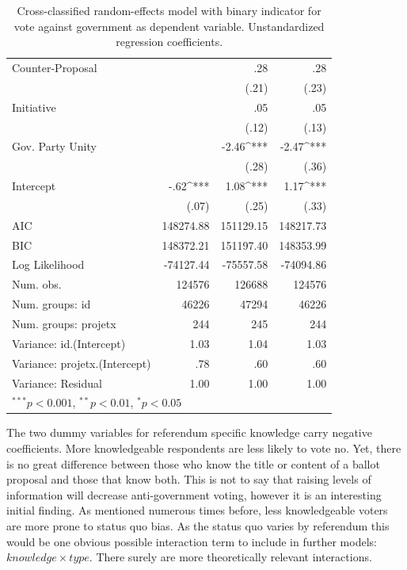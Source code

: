 \documentclass[11pt,a4paper]{article}\usepackage[]{graphicx}\usepackage[]{color}
\begin{document}
\begin{table}[htb]
\begin{tabular}{l D{.}{.}{6.5}@{} D{.}{.}{6.5}@{} D{.}{.}{6.5}@{} }
\quad Counter-Proposal        &            & .28         & .28         \\
                              &            & (.21)       & (.23)       \\
\quad Initiative              &            & .05         & .05         \\
                              &            & (.12)       & (.13)       \\
\quad Gov. Party Unity        &            & -2.46^{***} & -2.47^{***} \\
                              &            & (.28)       & (.36)       \\
Intercept                     & -.62^{***} & 1.08^{***}  & 1.17^{***}  \\
                              & (.07)      & (.25)       & (.33)       \\
\midrule
AIC                           & 148274.88  & 151129.15   & 148217.73   \\
BIC                           & 148372.21  & 151197.40   & 148353.99   \\
Log Likelihood                & -74127.44  & -75557.58   & -74094.86   \\
Num. obs.                     & 124576     & 126688      & 124576      \\
Num. groups: id               & 46226      & 47294       & 46226       \\
Num. groups: projetx          & 244        & 245         & 244         \\
Variance: id.(Intercept)      & 1.03       & 1.04        & 1.03        \\
Variance: projetx.(Intercept) & .78        & .60         & .60         \\
Variance: Residual            & 1.00       & 1.00        & 1.00        \\
\bottomrule
{}
\end{tabular}

    \caption{Cross-classified random-effects model with binary indicator for vote against government as dependent variable. Unstandardized regression coefficients.}\label{tab:regtable}
    \end{table}
    
    The two dummy variables for referendum specific knowledge carry negative coefficients. More knowledgeable respondents are less likely to vote no. Yet, there is no great difference between those who know the title or content of a ballot proposal and those that know both. This is not to say that raising levels of information will decrease anti-government voting, however it is an interesting initial finding. As mentioned numerous times before, less knowledgeable voters are more prone to status quo bias. As the status quo varies by referendum this would be one obvious possible interaction term to include in further models: $knowledge \times type$. There surely are more theoretically relevant interactions. 
    
\end{document}

